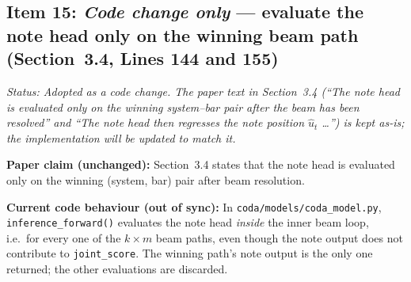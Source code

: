\documentclass{article}
\begin{document}
\subsection*{Item 15: \emph{Code change only} --- evaluate the note head only on the winning beam path (Section~3.4, Lines 144 and 155)}

\textit{Status: Adopted as a code change. The paper text in Section~3.4 (``The note head is evaluated only on the winning system--bar pair after the beam has been resolved'' and ``The note head then regresses the note position $\hat{u}_t$ \ldots'') is kept as-is; the implementation will be updated to match it.}

\textbf{Paper claim (unchanged):}
Section~3.4 states that the note head is evaluated only on the winning (system, bar) pair after beam resolution.

\textbf{Current code behaviour (out of sync):}
In \texttt{coda/models/coda\_model.py}, \texttt{inference\_forward()} evaluates the note head \emph{inside} the inner beam loop, i.e.\ for every one of the $k \times m$ beam paths, even though the note output does not contribute to \texttt{joint\_score}. The winning path's note output is the only one returned; the other evaluations are discarded.
\end{document}
